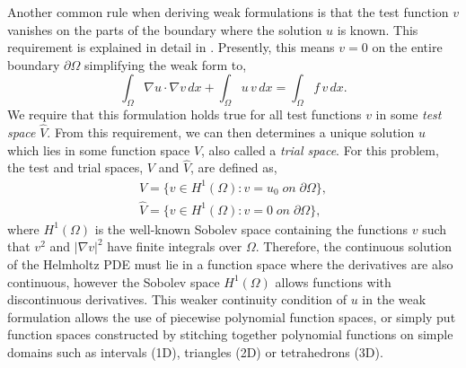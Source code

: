 \documentclass[]{article}
\begin{document}
Another common rule when deriving weak formulations is that the test function $v$ vanishes on the parts of the boundary where the solution $u$ is known.  This requirement is explained in detail in \cite{Langtangen2019}.  Presently, this means $v=0$ on the entire boundary $\partial \Omega$ simplifying the weak form to,
\begin{equation}
\int_{\Omega} \nabla u \cdot \nabla v \, dx + \int_{\Omega} u \, v \, dx = \int_{\Omega} f \, v \, dx.
\end{equation}
We require that this formulation holds true for all test functions $v$ in some \textit{test space} $\hat{V}$.  From this requirement, we can then determines a unique solution $u$ which lies in some function space $V$, also called a \textit{trial space}.  For this problem, the test and trial spaces, $V$ and $\hat{V}$, are defined as,
\begin{align}
V = \lbrace v \in H^1 (\Omega) : v=u_0 \; on \; \partial \Omega \rbrace, \\
\hat{V} = \lbrace v \in H^1 (\Omega) : v=0 \; on \; \partial \Omega \rbrace,
\end{align}
where $H^1 (\Omega)$ is the well-known Sobolev space containing the functions $v$ such that $v^2$ and $|\nabla v|^2$ have finite integrals over $\Omega$.  Therefore, the continuous solution of the Helmholtz PDE must lie in a function space where the derivatives are also continuous, however the Sobolev space $H^1 (\Omega)$ allows functions with discontinuous derivatives.  This weaker continuity condition of $u$ in the weak formulation allows the use of piecewise polynomial function spaces, or simply put function spaces constructed by stitching together polynomial functions on simple domains such as intervals (1D), triangles (2D) or tetrahedrons (3D). 
\end{document}
